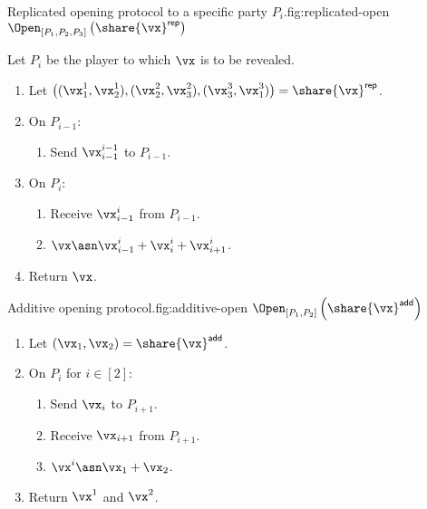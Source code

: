 \begin{Boxfig}{Replicated opening protocol to a specific party $P_i$.}{fig:replicated-open}
  {$\Open_{[P_1, P_2, P_3]} \left( \share{\vx}^{\mathsf{rep}} \right)$}
  
  Let $P_i$ be the player to which $\vx$ is to be revealed.
  
  \begin{enumerate}
  \item Let $\left( (\vx_1^1, \vx_2^1), (\vx_2^2, \vx_3^2), (\vx_3^3, \vx_1^3) \right) = \share{\vx}^{\mathsf{rep}}$.
  \item On $P_{i-1}$:
  \begin{enumerate}
    \item Send $\vx_{i-1}^{i-1}$ to $P_{i-1}$.
  \end{enumerate}
  \item On $P_i$:
  \begin{enumerate}
   \item Receive $\vx_{i-1}^{i}$ from $P_{i-1}$.
   \item $\vx \asn \vx_{i-1}^{i} + \vx_i^i + \vx_{i+1}^{i}$.
  \end{enumerate}
  \item Return $\vx$.
\end{enumerate}
\end{Boxfig}


\begin{Boxfig}{Additive opening protocol.}{fig:additive-open}
  {$\Open_{[P_1, P_2]} \left( \share{\vx}^{\mathsf{add}} \right)$}
  \begin{enumerate}
  \item Let $(\vx_1, \vx_2) = \share{\vx}^{\mathsf{add}}$.
  \item On $P_i$ for $i \in [2]$:
  \begin{enumerate}
    \item Send $\vx_i$ to $P_{i+1}$.
    \item Receive $\vx_{i+1}$ from $P_{i+1}$.
    \item $\vx^i \asn \vx_1 + \vx_2$.
  \end{enumerate}
  \item Return $\vx^1$ and $\vx^2$.
\end{enumerate}
\end{Boxfig}
